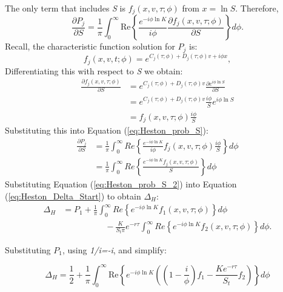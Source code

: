 \documentclass[a4paper]{article}
\begin{document}
The only term that includes \textit{S} is $f_j(x,v,\tau;\phi)$ from $x=\ln S$. Therefore, 
\begin{equation}
	\frac{\partial P_j}{\partial S} = \frac{1}{\pi}\int_0^{\infty} \mbox{Re} \left\{ \frac{e^{-i\phi \ln K}}{i\phi}  \frac{\partial f_j(x,v,\tau;\phi)}{\partial S} \right\} d\phi. 
	\label{eq:Heston_prob_S}
\end{equation} 
Recall, the characteristic function solution for $P_j$ is:
\begin{equation*}
	f_j(x,v,t;\phi) = e^{C_j(\tau;\phi) + D_j(\tau;\phi)v + i\phi x},
\end{equation*}
Differentiating this with respect to \textit{S} we obtain:
\begin{align}
	\frac{\partial f_j(x,v,\tau;\phi)}{\partial S} &  = e^{C_j(\tau;\phi) + D_j(\tau;\phi)v} \frac{\partial e^{i\phi \ln S}}{\partial S} \\
	 & = e^{C_j(\tau;\phi) + D_j(\tau;\phi)v}\frac{i\phi}{S}e^{i\phi \ln S} \\
	 & = f_j(x,v,\tau;\phi) \frac{i\phi}{S} \label{eq:Heston_dfds}
\end{align}
Substituting this into Equation (\ref{eq:Heston_prob_S}):
\begin{align}
	\frac{\partial P_j}{\partial S} & = \frac{1}{\pi}\int_0^{\infty} Re \left\{ \frac{e^{-i\phi \ln K}}{i\phi} f_j(x,v,\tau;\phi) \frac{i\phi}{S} \right\} d\phi \\
	 & = \frac{1}{\pi}\int_0^{\infty} Re \left\{ \frac{e^{-i\phi \ln K} f_j(x,v,\tau;\phi)}{S} \right\} d\phi \label{eq:Heston_prob_S_2}
\end{align}
Substituting Equation (\ref{eq:Heston_prob_S_2}) into Equation (\ref{eq:Heston_Delta_Start}) to obtain $\Delta_H$:
\begin{align*}
	\Delta_H & = P_1 + \frac{1}{\pi}\int_0^{\infty} Re \left\{ e^{-i\phi \ln K} f_1(x,v,\tau;\phi) \right\} d\phi \\      
	& \quad \quad \quad \quad \quad - \frac{K}{S_t\pi}e^{-r\tau}\int_0^{\infty} Re \left\{ e^{-i\phi \ln K} f_2(x,v,\tau;\phi) \right\} d\phi.
\end{align*}

Substituting $P_1$, using \textit{1/i=-i}, and simplify:

\begin{equation} \label{Del}
\Delta_H = \frac{1}{2}+\frac{1}{\pi}\int_0^\infty \mbox{Re}\left\{e^{-i \phi \ln K} \left(\left(1-\frac{i}{\phi}\right) f_1-\frac{K e^{-r\tau}}{S_t}f_2\right)\right\}d \phi 
\end{equation}
\end{document}
